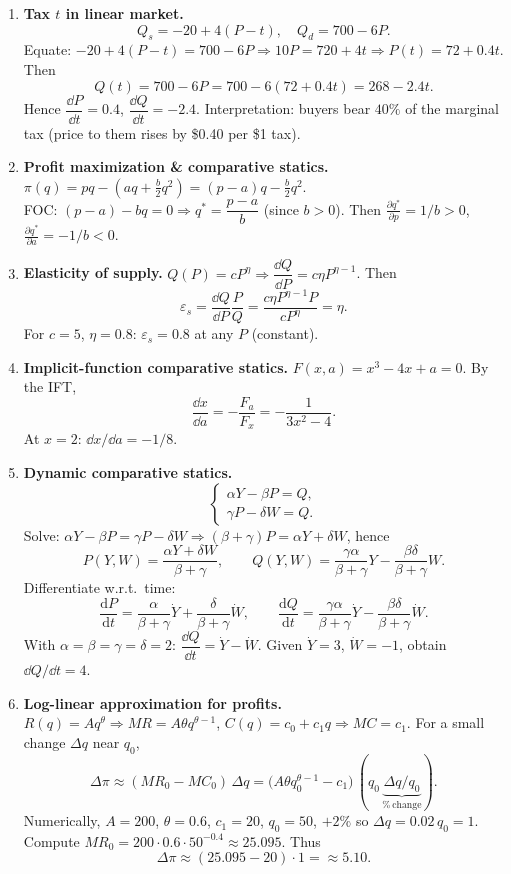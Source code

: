\documentclass[12pt]{article}
\newcommand{\dtotal}[2]{\frac{\mathrm{d} #1}{\mathrm{d} #2}}
\newcommand{\pd}[2]{\frac{\partial #1}{\partial #2}}
\begin{document}
\begin{enumerate}[resume]
\item \textbf{Tax $t$ in linear market.}
\[
Q_s=-20+4(P-t),\quad Q_d=700-6P.
\]
Equate: $-20+4(P-t)=700-6P\Rightarrow 10P=720+4t\Rightarrow \boxed{P(t)=72+0.4t}$. Then
\[
Q(t)=700-6P=700-6(72+0.4t)=\boxed{268-2.4t}.
\]
Hence $\boxed{\dfrac{\dd P}{\dd t}=0.4}$, $\boxed{\dfrac{\dd Q}{\dd t}=-2.4}$. Interpretation: buyers bear $40\%$ of the marginal tax (price to them rises by \$0.40 per \$1 tax).

\item \textbf{Profit maximization \& comparative statics.} $\pi(q)=pq-(aq+\tfrac{b}{2}q^2)=(p-a)q-\tfrac{b}{2}q^2$.\\
FOC: $(p-a)-bq=0\Rightarrow \boxed{q^*=\dfrac{p-a}{b}}$ (since $b>0$). Then $\boxed{\pd{q^*}{p}=1/b>0}$, $\boxed{\pd{q^*}{a}=-1/b<0}$.

\item \textbf{Elasticity of supply.} $Q(P)=cP^{\eta}\Rightarrow \dfrac{\dd Q}{\dd P}=c\eta P^{\eta-1}$. Then
\[
\varepsilon_s=\frac{\dd Q}{\dd P}\frac{P}{Q}=\frac{c\eta P^{\eta-1}P}{cP^\eta}=\boxed{\eta}.
\]
For $c=5$, $\eta=0.8$: $\boxed{\varepsilon_s=0.8}$ at any $P$ (constant).

\item \textbf{Implicit-function comparative statics.} $F(x,a)=x^3-4x+a=0$. By the IFT,
\[
\frac{\dd x}{\dd a}=-\frac{F_a}{F_x}=-\frac{1}{3x^2-4}.
\]
At $x=2$: $\boxed{\dd x/\dd a=-1/8}$.

\item \textbf{Dynamic comparative statics.}
\[
\begin{cases}
\alpha Y-\beta P=Q,\\
\gamma P-\delta W=Q.
\end{cases}
\]
Solve: $\alpha Y-\beta P=\gamma P-\delta W\Rightarrow (\beta+\gamma)P=\alpha Y+\delta W$, hence
\[
\boxed{P(Y,W)=\frac{\alpha Y+\delta W}{\beta+\gamma}},\qquad
\boxed{Q(Y,W)=\frac{\gamma\alpha}{\beta+\gamma}Y-\frac{\beta\delta}{\beta+\gamma}W}.
\]
Differentiate w.r.t.\ time:
\[
\boxed{\dtotal{P}{t}=\frac{\alpha}{\beta+\gamma}\dot Y+\frac{\delta}{\beta+\gamma}\dot W},\qquad
\boxed{\dtotal{Q}{t}=\frac{\gamma\alpha}{\beta+\gamma}\dot Y-\frac{\beta\delta}{\beta+\gamma}\dot W}.
\]
With $\alpha=\beta=\gamma=\delta=2$: $\dfrac{\dd Q}{\dd t}=\dot Y-\dot W$. Given $\dot Y=3$, $\dot W=-1$, obtain $\boxed{\dd Q/\dd t=4}$.

\item \textbf{Log-linear approximation for profits.}\\
$R(q)=Aq^\theta\Rightarrow MR=A\theta q^{\theta-1}$, $C(q)=c_0+c_1q\Rightarrow MC=c_1$. For a small change $\Delta q$ near $q_0$,
\[
\Delta\pi \approx (MR_0-MC_0)\,\Delta q=\big(A\theta q_0^{\theta-1}-c_1\big)\,(q_0\,\underbrace{\Delta q/q_0}_{\%\,\text{change}}).
\]
Numerically, $A=200$, $\theta=0.6$, $c_1=20$, $q_0=50$, $+2\%$ so $\Delta q=0.02\,q_0=1$. Compute $MR_0=200\cdot 0.6\cdot 50^{-0.4}\approx 25.095$. Thus
\[
\Delta\pi \approx (25.095-20)\cdot 1=\boxed{\approx 5.10}.
\]


\end{enumerate}
\end{document}
